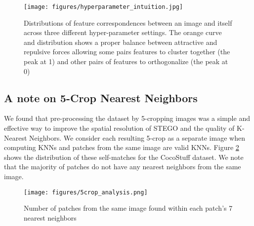 \documentclass{article} \usepackage{iclr2022_conference,times}
\begin{document}
\begin{figure}[h]
    \centering
    \texttt{[image: figures/hyperparameter\_intuition.jpg]}
    \caption{Distributions of feature correspondences between an image and itself across three different hyper-parameter settings. The orange curve and distribution shows a proper balance between attractive and repulsive forces allowing some pairs features to cluster together (the peak at 1) and other pairs of features to orthogonalize (the peak at 0)}
    \label{fig:hyperparameter-intuition}
\end{figure}

\newpage

\subsection{A note on 5-Crop Nearest Neighbors}

We found that pre-processing the dataset by 5-cropping images was a simple and effective way to improve the spatial resolution of STEGO and the quality of K-Nearest Neighbors. We consider each resulting 5-crop as a separate image when computing KNNs and patches from the same image are valid KNNs. Figure \ref{fig:5crop} shows the distribution of these self-matches for the CocoStuff dataset. We note that the majority of patches do not have any nearest neighbors from the same image.



\begin{figure}[h]
    \centering
    \texttt{[image: figures/5crop\_analysis.png]}
    \caption{Number of patches from the same image found within each patch's 7 nearest neighbors}
    \label{fig:5crop}
\end{figure}
\end{document}
